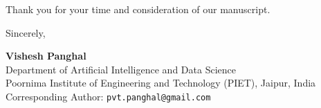\documentclass[11pt]{article}
\begin{document}
Thank you for your time and consideration of our manuscript.

Sincerely,

\textbf{Vishesh Panghal} \\
Department of Artificial Intelligence and Data Science \\
Poornima Institute of Engineering and Technology (PIET), Jaipur, India \\
Corresponding Author: \texttt{pvt.panghal@gmail.com}
\end{document}
